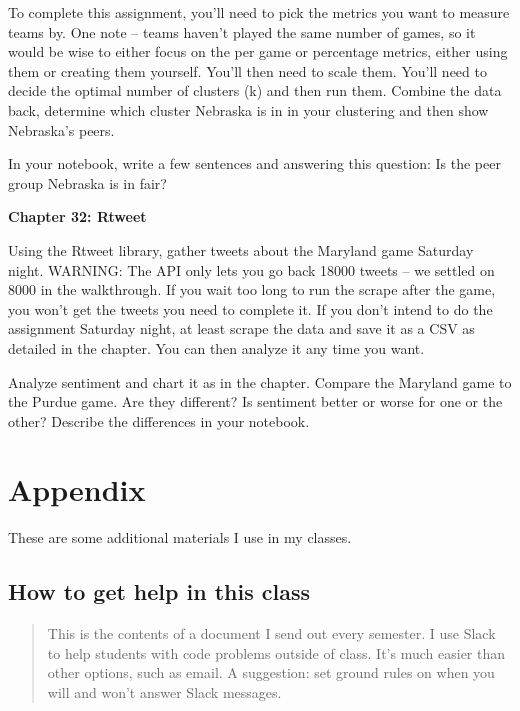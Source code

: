 \documentclass[
]{book}
\begin{document}
To complete this assignment, you'll need to pick the metrics you want to measure teams by. One note -- teams haven't played the same number of games, so it would be wise to either focus on the per game or percentage metrics, either using them or creating them yourself. You'll then need to scale them. You'll need to decide the optimal number of clusters (k) and then run them. Combine the data back, determine which cluster Nebraska is in in your clustering and then show Nebraska's peers.

In your notebook, write a few sentences and answering this question: Is the peer group Nebraska is in fair?

\textbf{Chapter 32: Rtweet}

Using the Rtweet library, gather tweets about the Maryland game Saturday night. WARNING: The API only lets you go back 18000 tweets -- we settled on 8000 in the walkthrough. If you wait too long to run the scrape after the game, you won't get the tweets you need to complete it. If you don't intend to do the assignment Saturday night, at least scrape the data and save it as a CSV as detailed in the chapter. You can then analyze it any time you want.

Analyze sentiment and chart it as in the chapter. Compare the Maryland game to the Purdue game. Are they different? Is sentiment better or worse for one or the other? Describe the differences in your notebook.

\hypertarget{appendix}{%
\chapter{Appendix}\label{appendix}}

These are some additional materials I use in my classes.

\hypertarget{how-to-get-help-in-this-class}{%
\section{How to get help in this class}\label{how-to-get-help-in-this-class}}

\begin{quote}
This is the contents of a document I send out every semester. I use Slack to help students with code problems outside of class. It's much easier than other options, such as email. A suggestion: set ground rules on when you will and won't answer Slack messages.
\end{quote}
\end{document}
